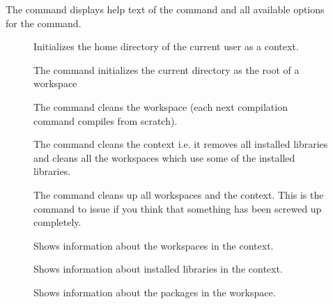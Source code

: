 \begin{description}

\item[] The command  displays help text of the
  command and all available options for the command.

\item[]
  \begin{description}

  \item[] Initializes the home directory  of the current
    user as a context.

  \item[] The command  initializes the
    current directory as the root of a workspace

  \end{description}

\item[]

  \begin{description}

  \item[] The command  cleans the
    workspace (each next compilation command compiles from scratch).


  \item[] The command  cleans the
    context i.e. it removes all installed libraries and cleans all the
    workspaces which use some of the installed libraries.

  \item[] The command  cleans up all workspaces
    and the context. This is the command to issue if you think that something
    has been screwed up completely.
  \end{description}


\item[]
  \begin{description}

  \item[] Shows information about the workspaces in the
    context.

  \item[] Shows information about installed libraries in the
    context.

  \item[] Shows information about the packages in the workspace.


\end{description}
\end{description}
